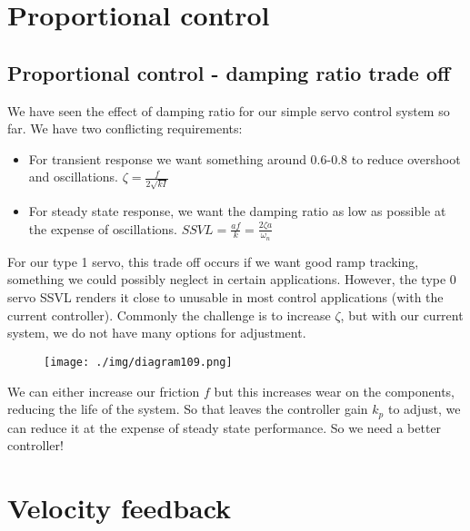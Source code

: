 \section{Proportional control}
\subsection{Proportional control - damping ratio trade off}
We have seen the effect of damping ratio for our simple servo control system so far. We have two conflicting requirements:
\begin{itemize}
  \item For transient response we want something around 0.6-0.8 to reduce overshoot and oscillations. $\zeta = \frac{f}{2\sqrt{kI}}$
  \item For steady state response, we want the damping ratio as low as possible at the expense of oscillations. $SSVL = \frac{af}{k} = \frac{2\zeta a }{\omega_n}$
\end{itemize}
For our type 1 servo, this trade off occurs if we want good ramp tracking, something we could possibly neglect in certain applications. However, the type 0 servo SSVL  renders it close to unusable in most control applications (with the current controller). Commonly the challenge is to increase $\zeta$, but with our current system, we do not have many options for adjustment.
\begin{figure}[H]
  \centerline{\texttt{[image: ./img/diagram109.png]}}
  \caption{}
\end{figure}
We can either increase our friction $f$ but this increases wear on the components, reducing the life of the system. So that leaves the controller gain $k_p$ to adjust, we can reduce it at the expense of steady state performance. So we need a better controller!
\section{Velocity feedback}
